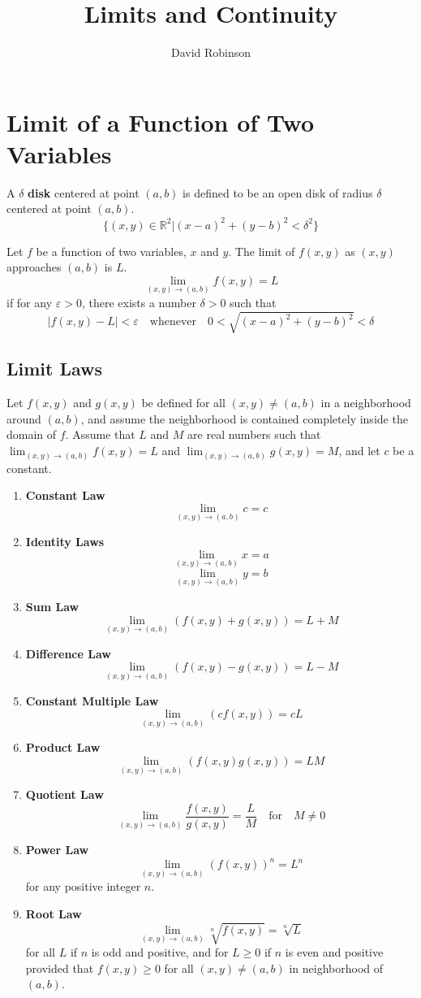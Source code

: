 \documentclass{article}
\title{Limits and Continuity}
\author{David Robinson}
\date{}
\begin{document}
\maketitle

\section*{Limit of a Function of Two Variables}

A $\delta$ \textbf{disk} centered at point $(a, b)$ is defined to be an open disk of radius $\delta$ centered at point $(a, b)$.
\[\{(x, y)\in\mathbb{R}^2 | {(x-a)}^2 + {(y-b)}^2 < \delta^2\}\]

Let $f$ be a function of two variables, $x$ and $y$. The limit of $f(x, y)$ as $(x, y)$ approaches $(a, b)$ is $L$.
\[\lim_{(x, y)\rightarrow(a, b)}f(x, y)=L\]
if for any $\varepsilon > 0$, there exists a number $\delta > 0$ such that
\[|f(x, y)-L| < \varepsilon \quad\text{whenever}\quad 0 < \sqrt{{(x-a)}^2+{(y-b)}^2} < \delta\]

\subsection*{Limit Laws}
Let $f(x, y)$ and $g(x, y)$ be defined for all $(x, y)\neq(a, b)$ in a neighborhood around $(a, b)$, and assume the neighborhood is contained completely inside the domain of $f$. Assume that $L$ and $M$ are real numbers such that $\lim_{(x, y)\rightarrow(a, b)}f(x, y)=L$ and $\lim_{(x, y)\rightarrow(a, b)}g(x, y)=M$, and let $c$ be a constant.
\begin{enumerate}
    \item \textbf{Constant Law}
    \[\lim_{(x, y)\rightarrow(a, b)}c=c\]
    \item \textbf{Identity Laws}
    \[\lim_{(x, y)\rightarrow(a, b)}x=a\]
    \[\lim_{(x, y)\rightarrow(a, b)}y=b\]
    \item \textbf{Sum Law}
    \[\lim_{(x, y)\rightarrow(a, b)}(f(x, y)+g(x, y))=L+M\]
    \item \textbf{Difference Law}
    \[\lim_{(x, y)\rightarrow(a, b)}(f(x, y)-g(x, y))=L-M\]
    \item \textbf{Constant Multiple Law}
    \[\lim_{(x, y)\rightarrow(a, b)}(cf(x, y))=cL\]
    \item \textbf{Product Law}
    \[\lim_{(x, y)\rightarrow(a, b)}(f(x, y)g(x, y))=LM\]
    \item \textbf{Quotient Law}
    \[\lim_{(x, y)\rightarrow(a, b)}\frac{f(x, y)}{g(x, y)}=\frac{L}{M}\quad\text{for}\quad M\neq 0\]
    \item \textbf{Power Law}
    \[\lim_{(x, y)\rightarrow(a, b)}{(f(x, y))}^n=L^n\]
    for any positive integer $n$.
    \item \textbf{Root Law}
    \[\lim_{(x, y)\rightarrow(a, b)}\sqrt[n]{f(x, y)}=\sqrt[n]{L}\]
    for all $L$ if $n$ is odd and positive, and for $L\geq 0$ if $n$ is even and positive provided that $f(x, y)\geq 0$ for all $(x, y)\neq(a, b)$ in neighborhood of $(a, b)$.
\end{enumerate}
\end{document}
